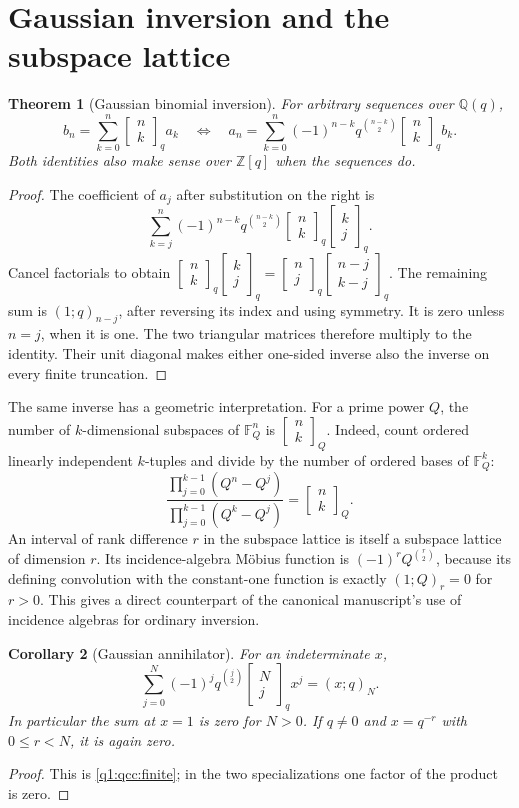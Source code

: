 \documentclass[11pt,a4paper,oneside,openany]{book}
\newtheorem{theorem}{Theorem}[chapter]
\newtheorem{corollary}[theorem]{Corollary}
\theoremstyle{definition}
\theoremstyle{remark}
\newcommand{\Z}{\mathbb Z}
\newcommand{\Q}{\mathbb Q}
\newcommand{\F}{\mathbb F}
\newcommand{\GB}[3][q]{\begin{bmatrix}#2\\#3\end{bmatrix}_{#1}}
\newcommand{\G}[2]{\GB{#1}{#2}}
\newcommand{\qp}[2]{(#1;q)_{#2}}
\begin{document}
\section{Gaussian inversion and the subspace lattice}
\begin{theorem}[Gaussian binomial inversion]\label{q1:qcc:inversion}
For arbitrary sequences over \(\Q(q)\),
\begin{equation}\label{q1:qcc:inverse-pair}
 b_n=\sum_{k=0}^n\GB nk a_k
 \quad\Longleftrightarrow\quad
 a_n=\sum_{k=0}^n(-1)^{n-k}q^{\binom{n-k}{2}}\GB nk b_k.
\end{equation}
Both identities also make sense over \(\Z[q]\) when the sequences do.
\end{theorem}
\begin{proof}
The coefficient of \(a_j\) after substitution on the right is
\[
 \sum_{k=j}^n(-1)^{n-k}q^{\binom{n-k}{2}}\GB nk\GB kj.
\]
Cancel factorials to obtain
\(\GB nk\GB kj=\GB nj\GB{n-j}{k-j}\).
The remaining sum is \((1;q)_{n-j}\), after reversing its index and using
symmetry. It is zero unless \(n=j\), when it is one. The two triangular
matrices therefore multiply to the identity. Their unit diagonal makes either
one-sided inverse also the inverse on every finite truncation.
\end{proof}

The same inverse has a geometric interpretation. For a prime power \(Q\), the
number of \(k\)-dimensional subspaces of \(\F_Q^n\) is \(\GB[Q]nk\).
Indeed, count ordered linearly independent \(k\)-tuples and divide by the number
of ordered bases of \(\F_Q^k\):
\[
 \frac{\prod_{j=0}^{k-1}(Q^n-Q^j)}{\prod_{j=0}^{k-1}(Q^k-Q^j)}=\GB[Q]nk.
\]
An interval of rank difference \(r\) in the subspace lattice is itself a
subspace lattice of dimension \(r\). Its incidence-algebra M\"obius function is
\((-1)^rQ^{\binom r2}\), because its defining convolution with the constant-one
function is exactly \((1;Q)_r=0\) for \(r>0\). This gives a direct counterpart
of the canonical manuscript's use of incidence algebras for ordinary inversion.

\begin{corollary}[Gaussian annihilator]
\label{q3:cor:annihilator}
For an indeterminate $x$,
\begin{equation}
 \sum_{j=0}^N(-1)^jq^{\binom j2}\G Nj x^j=\qp xN.
 \label{q3:eq:annihilator}
\end{equation}
In particular the sum at $x=1$ is zero for $N>0$. If $q\ne0$ and
$x=q^{-r}$ with $0\le r<N$, it is again zero.
\end{corollary}
\begin{proof}
This is \cref{q1:qcc:finite}; in the two specializations one factor of the
product is zero.
\end{proof}
\end{document}

